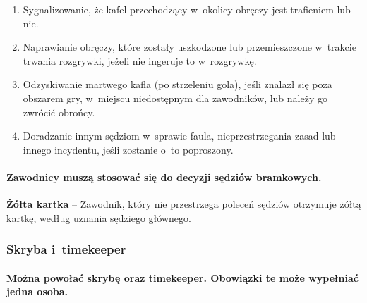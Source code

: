 \documentclass[12pt]{article}
\newcommand\yellowcard[1]{\bgroup\textcolor{darkyellow}{\textbf{#1}}}
\begin{document}
\begin{enumerate}
	\item Sygnalizowanie, że kafel przechodzący w~okolicy obręczy jest
	      trafieniem lub nie.

	\item Naprawianie obręczy, które zostały uszkodzone lub przemieszczone w~trakcie trwania rozgrywki, jeżeli nie ingeruje to w~rozgrywkę.

	\item Odzyskiwanie martwego kafla (po strzeleniu gola), jeśli znalazł się
	      poza obszarem gry, w~miejscu niedostępnym dla zawodników, lub należy go
	      zwrócić obrońcy.

	\item Doradzanie innym sędziom w~sprawie faula, nieprzestrzegania zasad lub
	      innego incydentu, jeśli zostanie o~to poproszony.
\end{enumerate}

\paragraph{Zawodnicy muszą stosować się do decyzji sędziów
	bramkowych.}

\yellowcard{Żółta kartka} -- Zawodnik, który nie przestrzega poleceń sędziów
otrzymuje żółtą kartkę, według uznania sędziego głównego.

\subsubsection{Skryba i~timekeeper}

\paragraph{Można powołać skrybę oraz timekeeper. Obowiązki te
	może wypełniać jedna osoba.}
\end{document}
